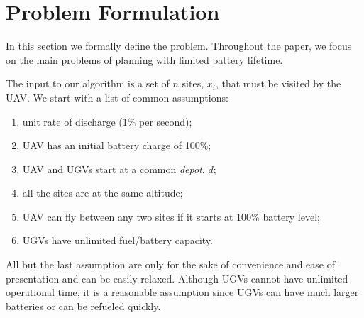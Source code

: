 \documentclass[letterpaper,10pt,conference]{ieeeconf}
\begin{document}

\section{Problem Formulation} \label{sec:probForm}
In this section we formally define the problem. Throughout the paper, we focus on the main problems of planning with limited battery lifetime.%

The input to our algorithm is a set of $n$ sites, $x_i$, that must be visited by the UAV. We start with a list of common assumptions:
\begin{enumerate} \label{assumptions}
\item unit rate of discharge (1\% per second);
\item UAV has an initial battery charge of 100\%;
\item UAV and UGVs start at a common \emph{depot}, $d$;
\item all the sites are at the same altitude;
\item UAV can fly between any two sites if it starts at 100\% battery level;
\item UGVs have unlimited fuel/battery capacity.
\end{enumerate}
All but the last assumption are only for the sake of convenience and ease of presentation and can be easily relaxed. Although UGVs cannot have unlimited operational time, it is a reasonable assumption since UGVs can have much larger batteries or can be refueled quickly.
\end{document}
